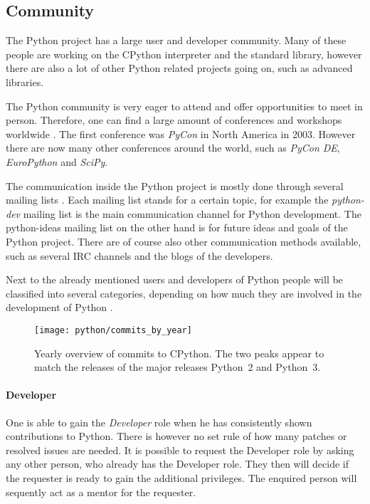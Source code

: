 
\subsection{Community} %

The Python project has a large user and developer community. Many of these people are
working on the CPython interpreter and the standard library, however there are
also a lot of other Python related projects going on, such as advanced libraries.

The Python community is very eager to attend and offer opportunities to meet in
person. Therefore, one can find a large amount of conferences and workshops
worldwide \cite{PythonConferences}. The first conference was \emph{PyCon} in
North America in 2003. However there are now many other conferences around the
world, such as \emph{PyCon DE}, \emph{EuroPython} and \emph{SciPy}.

The communication inside the Python project is mostly done through several
mailing lists \cite{PythonCommunication}. Each mailing list stands for a
certain topic, for example the \emph{python-dev} mailing list is the main
communication channel for Python development. The python-ideas mailing list on
the other hand is for future ideas and goals of the Python project. There are
of course also other communication methods available, such as several \ac{IRC}
channels and the blogs of the developers.

Next to the already mentioned users and developers of Python people will be
classified into several categories, depending on how much they are involved in
the development of Python \cite{PythonCoreDeveloper}.

\begin{figure}[htbp]
  \centering
  \texttt{[image: python/commits\_by\_year]}
  \caption{Yearly overview of commits to CPython. The two peaks appear to match
  the releases of the major releases Python~2 and Python~3.}
\end{figure}

\paragraph{Developer}

One is able to gain the \emph{Developer} role when he has consistently shown
contributions to Python. There is however no set rule of how many patches or
resolved issues are needed. It is possible to request the Developer role by
asking any other person, who already has the Developer role. They then will
decide if the requester is ready to gain the additional privileges. The
enquired person will sequently act as a mentor for the requester.

